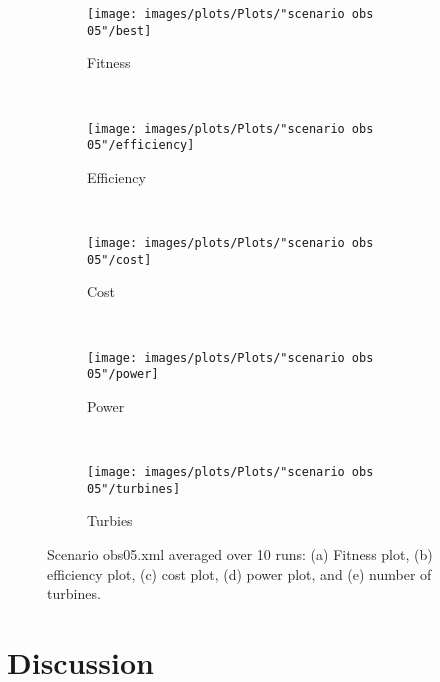 \begin{figure}[h!]
    \centering
      \begin{subfigure}[b]{0.31\textwidth}
        \texttt{[image: images/plots/Plots/"scenario obs 05"/best]}
        \caption{Fitness}
        \hfill
        \label{plot:fitness plot scenario obs 05}
    \end{subfigure}
    ~
      \begin{subfigure}[b]{0.31\textwidth}
        \texttt{[image: images/plots/Plots/"scenario obs 05"/efficiency]}
        \caption{Efficiency}
        \hfill
        \label{plot:efficiency plot scenario obs 05}
    \end{subfigure}
    ~
    \begin{subfigure}[b]{0.31\textwidth}
        \texttt{[image: images/plots/Plots/"scenario obs 05"/cost]}
        \caption{Cost}
        \hfill
        \label{plot:cost plot scenario obs 05}
    \end{subfigure}
    ~
    \begin{subfigure}[b]{0.31\textwidth}
        \texttt{[image: images/plots/Plots/"scenario obs 05"/power]}
        \caption{Power}
        \hfill
        \label{plot:power plot scenario obs 05}
    \end{subfigure}
    ~
    \begin{subfigure}[b]{0.31\textwidth}
        \texttt{[image: images/plots/Plots/"scenario obs 05"/turbines]}
        \caption{Turbies}
        \hfill
        \label{plot:turbines plot scenario obs 05}
    \end{subfigure}
    \caption{Scenario obs05.xml averaged over 10 runs: (a) Fitness plot, (b) efficiency plot, (c) cost plot, (d) power plot, and (e) number of turbines.}
    \label{plot:scenario obs 05}
\end{figure}


\section{Discussion}\label{section:discussion}